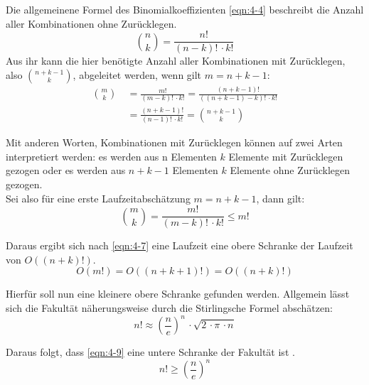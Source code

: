 Die allgemeinene Formel des Binomialkoeffizienten \eqref{eqn:4-4} beschreibt die Anzahl aller Kombinationen ohne Zurücklegen. 
\begin{equation} \label{eqn:4-4}
\tag{4-4}
\binom{n}{k} = \frac{n!}{(n-k)!\, \cdotp k!}
\end{equation} 
Aus ihr kann die hier benötigte Anzahl aller Kombinationen mit Zurücklegen, also  $ \binom{n + k - 1}{k} $, abgeleitet werden, wenn gilt $ m = n + k - 1 $:
\begin{equation} \label{eqn:4-5}
\tag{4-5}
\begin{aligned}
\binom{m}{k} &\ {} = \frac{m!}{(m - k)!\, \cdotp k!} 
= \frac{(n+k-1)!}{((n+k-1)-k)!\, \cdotp k!} \\
&\ = \frac{(n+k-1)!}{(n-1)!\, \cdotp k!} 
= \binom{n + k - 1}{k}
\end{aligned}
\end{equation}

Mit anderen Worten, Kombinationen mit Zurücklegen können auf zwei Arten interpretiert werden: es werden aus n Elementen $ k $ Elemente mit Zurücklegen gezogen oder es werden aus $ n + k - 1 $ Elementen $ k $ Elemente ohne Zurücklegen gezogen. \\

Sei also für eine erste Laufzeitabschätzung $ m = n + k - 1 $, dann gilt:
\begin{equation} \label{eqn:4-6}
\tag{4-6}
\binom{m}{k} = \frac{m!}{(m - k)!\, \cdotp k!} \leq m!
\end{equation} 

Daraus ergibt sich nach \eqref{eqn:4-7} eine Laufzeit eine obere Schranke der Laufzeit von \linebreak $ O((n + k)!) $. 
\begin{equation} \label{eqn:4-7}
\tag{4-7}
O(m!) = O((n + k + 1)!) = O((n + k)!)
\end{equation} 

Hierfür soll nun eine kleinere obere Schranke gefunden werden. Allgemein lässt sich die Fakultät näherungsweise durch die Stirlingsche Formel \cite{bronst} abschätzen:
\begin{equation} \label{eqn:4-8}
\tag{4-8}
n! \approx \left( \frac{n}{e} \right) ^n \, \cdotp \sqrt{2 \, \cdotp \pi \, \cdotp n}
\end{equation} 

Daraus folgt, dass \eqref{eqn:4-9} eine untere Schranke der Fakultät ist \cite{script_binom}.
\begin{equation} \label{eqn:4-9}
\tag{4-9}
n! \geq \left( \frac{n}{e} \right) ^n 
\end{equation} 

